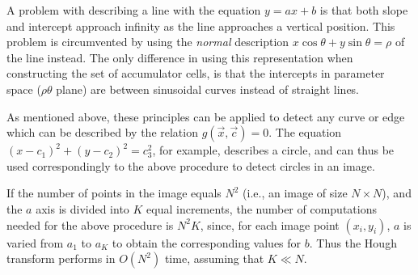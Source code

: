 A problem with describing a line with the equation $y=ax+b$ is that
both slope and intercept approach infinity as the line approaches a
vertical position.  This problem is circumvented by using the {\em
  normal\/} description $x\cos\theta+y\sin\theta=\rho$ of the line
instead.  The only difference in using this representation when
constructing the set of accumulator cells, is that the intercepts in
parameter space ($\rho\theta$ plane) are between sinusoidal curves
instead of straight lines.

As mentioned above, these principles can be applied to detect any
curve or edge which can be described by the relation
$g(\vec{x},\vec{c})=0$.  The equation
$(x-c_{1})^{2}+(y-c_{2})^{2}=c_{3}^{2}$, for example, describes a
circle, and can thus be used correspondingly to the above procedure to
detect circles in an image.

If the number of points in the image equals $N^{2}$ (i.e., an image of
size $N\times N$), and the $a$ axis is divided into $K$ equal
increments, the number of computations needed for the above procedure
is $N^{2}K$, since, for each image point $(x_{i},y_{i})$, $a$ is
varied from $a_{1}$ to $a_{K}$ to obtain the corresponding values for
$b$.  Thus the Hough transform performs in $O(N^{2})$ time, assuming
that $K\ll N$.
